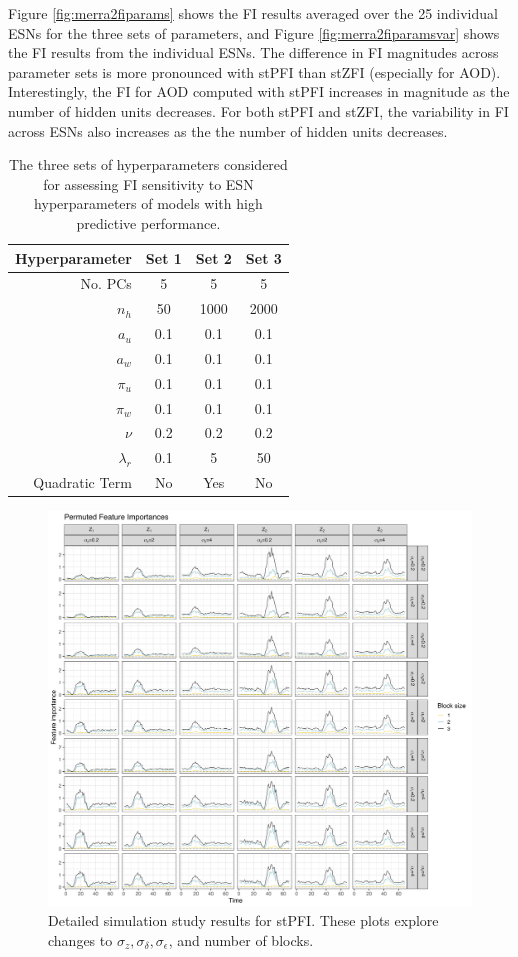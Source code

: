 \documentclass[AMS,STIX2COL]{WileyNJD-v2}
\begin{document}
Figure \ref{fig:merra2fiparams} shows the FI results averaged over the 25 individual ESNs for the three sets of parameters, and Figure \ref{fig:merra2fiparamsvar} shows the FI results from the individual ESNs. The difference in FI magnitudes across parameter sets is more pronounced with stPFI than stZFI (especially for AOD). Interestingly, the FI for AOD computed with stPFI increases in magnitude as the number of hidden units decreases. For both stPFI and stZFI, the variability in FI across ESNs also increases as the the number of hidden units decreases.

\begin{table}[ht]
\centering
\begin{tabular}{rccc}
\hline
Hyperparameter & Set 1 & Set 2 & Set 3\\
\hline
No. PCs & 5 & 5 & 5\\
$n_h$ & 50 & 1000 & 2000\\
$a_u$ & 0.1 & 0.1 & 0.1\\
$a_w$ & 0.1 & 0.1 & 0.1\\
$\pi_u$ & 0.1 & 0.1 & 0.1\\
$\pi_w$ &  0.1 & 0.1 & 0.1\\
$\nu$ & 0.2 & 0.2 & 0.2\\ 
$\lambda_r$ & 0.1 & 5 & 50\\ 
Quadratic Term & No & Yes & No\\
\hline
\end{tabular}
\caption{The three sets of hyperparameters considered for assessing FI sensitivity to ESN hyperparameters of models with high predictive performance.}
\label{tab:hp_top}
\end{table}

\begin{figure}[h]
    \centering
    \includegraphics[width=\textwidth]{figures/simulation_pfi_supplement.png}
    \caption{Detailed simulation study results for stPFI. These plots explore changes to $\sigma_z,\sigma_{\delta},\sigma_{\epsilon}$, and number of blocks.}
    \label{fig:pfi-supplement}
\end{figure}
\end{document}
